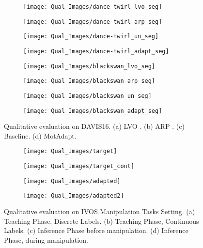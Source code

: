 \documentclass[letterpaper, 10 pt, conference]{ieeeconf}
\begin{document}
\begin{figure*}[ht!]
\centering
\begin{subfigure}{.19\textwidth}
    \texttt{[image: Qual\_Images/dance-twirl\_lvo\_seg]}
\end{subfigure}\begin{subfigure}{.19\textwidth}
    \texttt{[image: Qual\_Images/dance-twirl\_arp\_seg]}
\end{subfigure}\begin{subfigure}{.19\textwidth}
    \texttt{[image: Qual\_Images/dance-twirl\_un\_seg]}
\end{subfigure}\begin{subfigure}{.19\textwidth}
    \texttt{[image: Qual\_Images/dance-twirl\_adapt\_seg]}
\end{subfigure}

\begin{subfigure}{.19\textwidth}
    \texttt{[image: Qual\_Images/blackswan\_lvo\_seg]}
    \caption{}
\end{subfigure}\begin{subfigure}{.19\textwidth}
    \texttt{[image: Qual\_Images/blackswan\_arp\_seg]}
    \caption{}
\end{subfigure}\begin{subfigure}{.19\textwidth}
    \texttt{[image: Qual\_Images/blackswan\_un\_seg]}
    \caption{}
\end{subfigure}\begin{subfigure}{.19\textwidth}
    \texttt{[image: Qual\_Images/blackswan\_adapt\_seg]}
    \caption{}
\end{subfigure}
\caption{Qualitative evaluation on DAVIS16. (a) LVO \cite{tokmakov2017learning}. (b) ARP \cite{kohprimary}. (c) Baseline. (d) MotAdapt.}
\label{fig:davis}
\end{figure*} 

\begin{figure*}[ht!]
\centering
\begin{subfigure}{.18\textwidth}
    \texttt{[image: Qual\_Images/target]}
    \caption{}
\end{subfigure}\begin{subfigure}{.18\textwidth}
    \texttt{[image: Qual\_Images/target\_cont]}
    \caption{}
\end{subfigure}\begin{subfigure}{.18\textwidth}
    \texttt{[image: Qual\_Images/adapted]}
    \caption{}
\end{subfigure}\begin{subfigure}{.18\textwidth}
    \texttt{[image: Qual\_Images/adapted2]}
    \caption{}
\end{subfigure}

\caption{Qualitative evaluation on IVOS Manipulation Tasks Setting. (a) Teaching Phase, Discrete Labels. (b) Teaching Phase, Continuous Labels. (c) Inference Phase before manipulation. (d) Inference Phase, during manipulation.}
\label{fig:fordsm_qual}
\end{figure*} 
\end{document}
